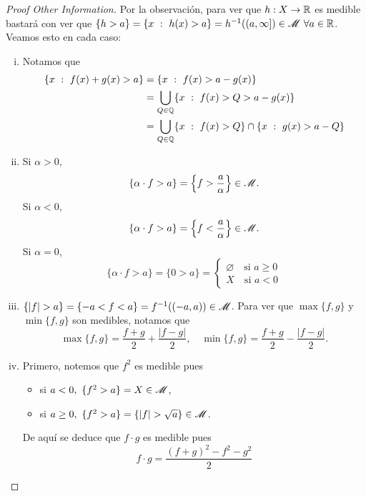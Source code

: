 \begin{proof}[Proof Other Information]
	Por la observación, para ver que $h : X \to \mathbb{R}$ es medible bastará con ver que $\{h > a\} = \{x \ : \ h(x) > a\} = h^{-1}((a,\infty]) \in \mathscr{M} \ \forall a \in \mathbb{R}$. Veamos esto en cada caso:
	\begin{enumerate}[i)]
		\item Notamos que 
		\begin{align*}
			\{x \ : \ f(x) + g(x) > a\} &= \{x \ : \ f(x) > a - g(x)\} \\
			&=\bigcup_{Q \in \Q} \{x \ : \ f(x) > Q > a - g(x)\} \\
			&=\bigcup_{Q \in \Q} \{x \ : \ f(x) > Q\} \cap \{x \ : \ g(x) > a - Q\}  
		\end{align*}

		\item Si $\alpha > 0$,
		\[ \{\alpha \cdot f > a\} = \left\{f > \frac{a}{\alpha}\right\} \in \mathscr{M}.\]
		Si $\alpha < 0$,
		\[ \{\alpha \cdot f > a\} = \left\{f < \frac{a}{\alpha}\right\} \in \mathscr{M}.\]
		Si $\alpha = 0$,
		\[ \{\alpha \cdot f > a\} = \{0 > a\} = \begin{cases}
			\varnothing \quad \text{si } a \geq 0 \\
			X \quad \text{si } a < 0
		\end{cases} \]

		\item $\{ |f| > a \} = \{ -a < f < a \} = f^{-1}((-a,a)) \in \mathscr{M}$. Para ver que $\max \{f,g\} $ y $\min \{f,g\}$ son medibles, notamos que
		\[ \max \{f,g\} = \frac{f+g}{2} + \frac{|f-g|}{2}, \quad \min \{f,g\} = \frac{f+g}{2} - \frac{|f-g|}{2}. \]
		
		\item Primero, notemos que $f^2$ es medible pues
		\begin{itemize}
			\item si $a < 0,\ \{f^2 > a\} = X \in \mathscr{M}$,

			\item si $a \geq 0, \ \{f^2 > a\} = \{|f| > \sqrt{a}\} \in \mathscr{M}$.
		\end{itemize}
		De aquí se deduce que $f \cdot g$ es medible pues
		\[ f \cdot g = \frac{(f+g)^2 - f^2 - g^2}{2} \]


\end{enumerate}
\end{proof}
